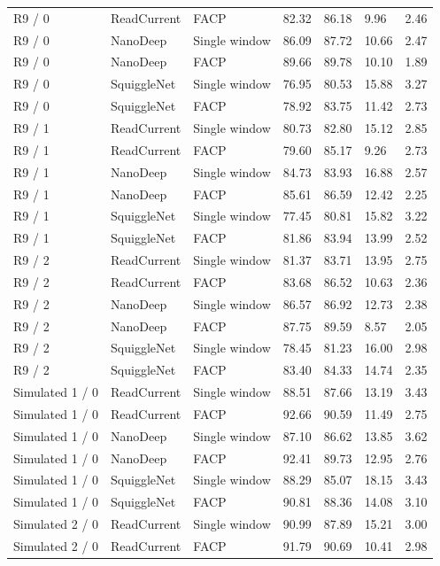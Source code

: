 \begin{longtable}{lllllll}
R9 / 0 & ReadCurrent & FACP & 82.32 & 86.18 & 9.96 & 2.46\\
R9 / 0 & NanoDeep & Single window & 86.09 & 87.72 & 10.66 & 2.47\\
R9 / 0 & NanoDeep & FACP & 89.66 & 89.78 & 10.10 & 1.89\\
R9 / 0 & SquiggleNet & Single window & 76.95 & 80.53 & 15.88 & 3.27\\
R9 / 0 & SquiggleNet & FACP & 78.92 & 83.75 & 11.42 & 2.73\\
R9 / 1 & ReadCurrent & Single window & 80.73 & 82.80 & 15.12 & 2.85\\
R9 / 1 & ReadCurrent & FACP & 79.60 & 85.17 & 9.26 & 2.73\\
R9 / 1 & NanoDeep & Single window & 84.73 & 83.93 & 16.88 & 2.57\\
R9 / 1 & NanoDeep & FACP & 85.61 & 86.59 & 12.42 & 2.25\\
R9 / 1 & SquiggleNet & Single window & 77.45 & 80.81 & 15.82 & 3.22\\
R9 / 1 & SquiggleNet & FACP & 81.86 & 83.94 & 13.99 & 2.52\\
R9 / 2 & ReadCurrent & Single window & 81.37 & 83.71 & 13.95 & 2.75\\
R9 / 2 & ReadCurrent & FACP & 83.68 & 86.52 & 10.63 & 2.36\\
R9 / 2 & NanoDeep & Single window & 86.57 & 86.92 & 12.73 & 2.38\\
R9 / 2 & NanoDeep & FACP & 87.75 & 89.59 & 8.57 & 2.05\\
R9 / 2 & SquiggleNet & Single window & 78.45 & 81.23 & 16.00 & 2.98\\
R9 / 2 & SquiggleNet & FACP & 83.40 & 84.33 & 14.74 & 2.35\\
Simulated 1 / 0 & ReadCurrent & Single window & 88.51 & 87.66 & 13.19 & 3.43\\
Simulated 1 / 0 & ReadCurrent & FACP & 92.66 & 90.59 & 11.49 & 2.75\\
Simulated 1 / 0 & NanoDeep & Single window & 87.10 & 86.62 & 13.85 & 3.62\\
Simulated 1 / 0 & NanoDeep & FACP & 92.41 & 89.73 & 12.95 & 2.76\\
Simulated 1 / 0 & SquiggleNet & Single window & 88.29 & 85.07 & 18.15 & 3.43\\
Simulated 1 / 0 & SquiggleNet & FACP & 90.81 & 88.36 & 14.08 & 3.10\\
Simulated 2 / 0 & ReadCurrent & Single window & 90.99 & 87.89 & 15.21 & 3.00\\
Simulated 2 / 0 & ReadCurrent & FACP & 91.79 & 90.69 & 10.41 & 2.98\\

\end{longtable}
